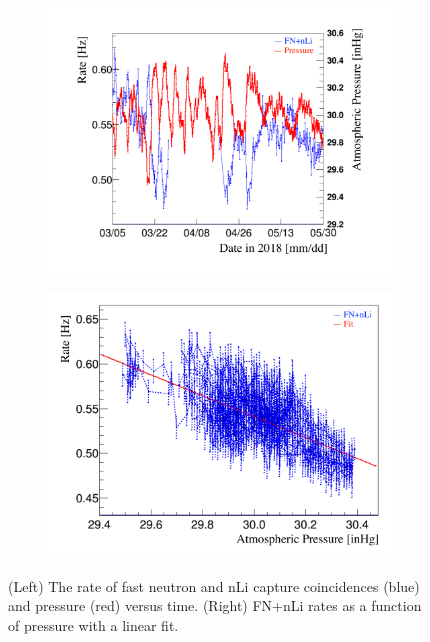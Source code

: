\begin{figure}[!b]
	\begin{subfigure}{0.5\linewidth}
		\centering
		\includegraphics[width=0.95\linewidth]{tex/7-oscillation-images/FNnLi_Rate}
		\label{fig:fnnlirate}
	\end{subfigure}
	\begin{subfigure}{0.5\linewidth}
		\centering
		\includegraphics[width=0.95\linewidth]{tex/7-oscillation-images/FNnLi_RateVsPressure}
		\label{fig:fnnliratevspressure}
	\end{subfigure}
	\caption{(Left) The rate of fast neutron and nLi capture coincidences (blue) and pressure (red) versus time. (Right) FN+nLi rates as a function of pressure with a linear fit. \cite{Kyzylova2370:2018}}
	\label{fig:atm}
\end{figure}

